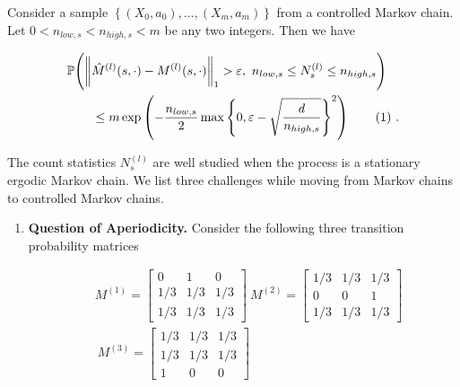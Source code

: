 \documentclass[opre,sglanonrev]{informs4}
\numberwithin{equation}{section}
\newcommand{\pow}[1]{^{(#1)}}
\newcommand{\Pbb}{\mathbb{P}}
\newcommand{\indexeddata}{\left\{(X_0,a_0),\dots,(X_m,a_m)\right\}}
\newcommand{\hatmls}{\Hat{M}^{(l)}(s,\cdot)}
\newcommand{\mls}{{M}^{(l)}(s,\cdot)}
\newcommand\numberthis{\addtocounter{equation}{1}\tag{\theequation}}
\newcommand{\prob}{\Pbb}
\newcommand{\eps}{\varepsilon}
\renewcommand{\epsilon}{\eps}
\begin{document}
{{\begin{proposition}
Consider a sample $\indexeddata$ from a controlled Markov chain.
% 
Let $0<n_{low,s}<n_{high,s}<m$ be any two integers. Then we have
\begin{small}
\begin{align*}
     & \prob\Bigg(\bigg\|\hatmls  -\mls\bigg\|_1 > \epsilon,\ n_{low,s}\leq N_s^{(l)}\leq n_{high,s} \Bigg) \\
     &\qquad 
     \leq m\exp\left({-\frac{n_{low,s}}{2} \max \left\{0,\epsilon-\sqrt{\frac{d}{n_{high,s}}}\right\}^2}\right)\numberthis~\label{eq:prop-t1bound}.
\end{align*}
\end{small}
\end{proposition}
}
%
{ The count statistics $N_s\pow l$ are well studied \citep{billingsley1961statistical} when the process is a stationary ergodic Markov chain.} %
We list three challenges while moving from Markov chains to controlled Markov chains. 
\begin{enumerate}
    \item \textbf{Question of Aperiodicity.} %
    Consider the following three transition probability matrices
    \begin{small}
    \begin{align*}
        &M\pow{1} = \begin{bmatrix}
        0 & 1 & 0 \\ 
        1/3 & 1/3 & 1/3 \\ 
        1/3 & 1/3 & 1/3
        \end{bmatrix} \ M\pow{2} = \begin{bmatrix}
        1/3 & 1/3 & 1/3 \\ 
        0 & 0 & 1 \\ 
        1/3 & 1/3 & 1/3
        \end{bmatrix}\\
        &\ M\pow{3} = \begin{bmatrix}
        1/3 & 1/3 & 1/3 \\ 
        1/3 & 1/3 & 1/3 \\ 
        1 & 0 & 0 

\end{bmatrix}
\end{align*}
\end{small}
\end{enumerate}}
\end{document}
